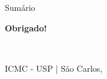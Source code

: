 \documentclass{beamer}
\begin{document}
{
\begin{frame}
    \titlepage
\end{frame}
}

\begin{frame}{Sumário}
    \tableofcontents
\end{frame}








\begin{frame}
    \centering
    \vspace{1.5cm}
    {\Huge \textbf{Obrigado!}}
    
    \vspace{1cm}
    \textbf{\insertauthor} \\
    \textit{\authoremail}
    
    \vspace{1.5cm}
    \scriptsize
    ICMC - USP | São Carlos, \the\year
\end{frame}



\end{document}
